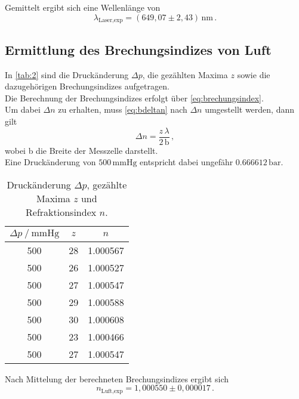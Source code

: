 Gemittelt ergibt sich eine Wellenlänge von
\begin{equation*}
    \lambda_\text{Laser,exp} = (649,07 \pm 2,43) \,\si{\nano\meter} \,.
\end{equation*}


\subsection{Ermittlung des Brechungsindizes von Luft}

In \autoref{tab:2} sind die Druckänderung $\Delta p$, die gezählten Maxima $z$ sowie die dazugehörigen Brechungsindizes aufgetragen. \\
Die Berechnung der Brechungsindizes erfolgt über \eqref{eq:brechungsindex}. \\
Um dabei $\Delta n $ zu erhalten, muss \eqref{eq:bdeltan} nach $\Delta n$ umgestellt werden, dann gilt
\begin{equation*}
    \Delta n = \dfrac{z \, \lambda}{2 \, \text{b}} \,,
\end{equation*} 
wobei b die Breite der Messzelle darstellt. \\
Eine Druckänderung von $500 \, \si{\milli\meter} \text{Hg}$ entspricht dabei ungefähr $0.666612 \,\si{\bar}$.

\begin{table}[H]
    \centering
    \caption{Druckänderung $\Delta p$, gezählte Maxima $z$ und Refraktionsindex $n$.}
    \label{tab:2}
    \begin{tabular}{S[table-format=3.0] S[table-format=2.0] S[table-format=1.6]}
      \toprule
    {$\Delta p \mathbin{/} \si{\milli\meter} \text{Hg}$} & {$z$} & {$n$} \\
                &           28          &           1.000567       \\
        500          &           26          &           1.000527       \\
        500          &           27          &           1.000547       \\
        500          &           29          &           1.000588       \\
        500          &           30          &           1.000608       \\
        500          &           23          &           1.000466       \\
        500          &           27          &           1.000547       \\
    \bottomrule
    \end{tabular}
\end{table}

Nach Mittelung der berechneten Brechungsindizes ergibt sich
\begin{equation*}
    n_\text{Luft,exp} = 1,000550 \pm 0,000017 \,.
\end{equation*}


